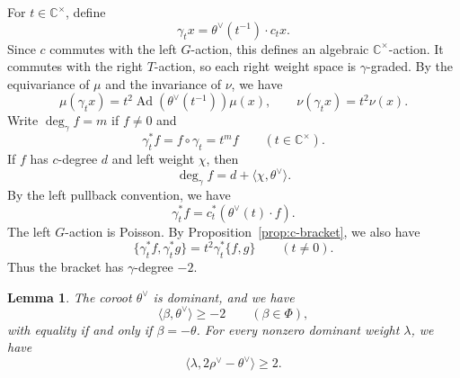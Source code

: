 \documentclass[12pt]{article}
\theoremstyle{paperplain}
\newtheorem{lemma}[theorem]{Lemma}
\theoremstyle{paperdefinition}
\DeclareMathOperator{\Ad}{Ad}
\newcommand{\C}{\mathbb C}
\begin{document}
For $t\in\C^\times$, define
$$
    \gamma_t x=\theta^\vee(t^{-1})\cdot c_t x.
$$
Since $c$ commutes with the left $G$-action, this defines an algebraic $\C^\times$-action. It commutes with the right $T$-action, so each right weight space is $\gamma$-graded. By the equivariance of $\mu$ and the invariance of $\nu$, we have
$$
    \mu(\gamma_t x)=t^2\Ad(\theta^\vee(t^{-1}))\mu(x),\qquad
    \nu(\gamma_t x)=t^2\nu(x).
$$
Write $\deg_\gamma f=m$ if $f\ne0$ and
$$
    \gamma_t^*f=f\circ\gamma_t=t^mf\qquad(t\in\C^\times).
$$
If $f$ has $c$-degree $d$ and left weight $\chi$, then
\begin{equation}\label{eq:gamma-degree}
    \deg_\gamma f=d+\langle\chi,\theta^\vee\rangle.
\end{equation}
By the left pullback convention, we have
$$
    \gamma_t^*f=c_t^*(\theta^\vee(t)\cdot f).
$$
The left $G$-action is Poisson. By Proposition~\ref{prop:c-bracket}, we also have
\begin{equation}\label{eq:scaled-bracket}
    \{\gamma_t^*f,\gamma_t^*g\}
    =t^2\gamma_t^*\{f,g\}\qquad(t\ne0).
\end{equation}
Thus the bracket has $\gamma$-degree $-2$.

\begin{lemma}\label{lem:root-estimates}
    The coroot $\theta^\vee$ is dominant, and we have
    $$
        \langle\beta,\theta^\vee\rangle\ge-2\qquad(\beta\in\Phi),
    $$
    with equality if and only if $\beta=-\theta$. For every nonzero dominant weight $\lambda$, we have
    $$
        \langle\lambda,2\rho^\vee-\theta^\vee\rangle\ge2.
    $$
\end{lemma}
\end{document}
